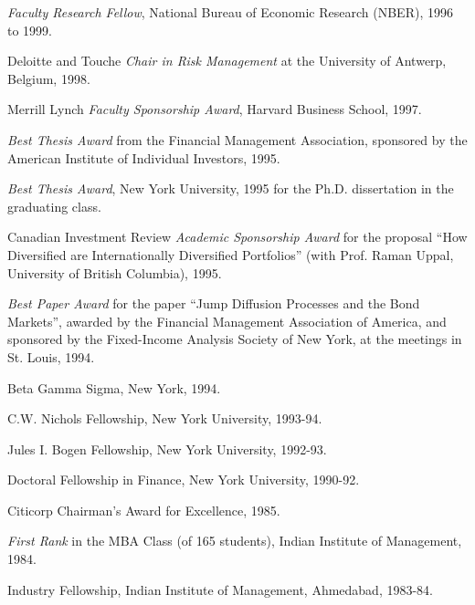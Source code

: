 \documentclass{article}
\begin{document}
\begin{description}
\begin{etaremune}
\item {\it Faculty Research Fellow}, National Bureau of Economic
Research (NBER), 1996 to 1999.

\item Deloitte and Touche {\it Chair in Risk Management} at the
University of Antwerp, Belgium, 1998.

\item Merrill Lynch {\it Faculty Sponsorship Award}, Harvard Business
School, 1997.

\item {\it Best Thesis Award} from the Financial Management Association,
sponsored by the American Institute
of Individual Investors, 1995. 

\item {\it Best Thesis Award}, New York University, 1995 for the Ph.D.
dissertation in the graduating class. 

\item Canadian Investment Review {\it Academic Sponsorship Award} for
the proposal ``How Diversified are Internationally Diversified
Portfolios'' (with Prof. Raman Uppal, University of British Columbia), 1995. 

\item {\it Best Paper Award} for the paper ``Jump Diffusion Processes
and the Bond Markets'', awarded by the Financial Management Association
of America, and sponsored by the Fixed-Income Analysis Society of New
York, at the meetings in St. Louis, 1994. 

\item Beta Gamma Sigma, New York, 1994. 

\item C.W. Nichols Fellowship, New York University, 1993-94. 

\item Jules I. Bogen Fellowship, New York University, 1992-93. 

\item Doctoral Fellowship in Finance, New York University, 1990-92. 

\item Citicorp Chairman's Award for Excellence, 1985. 

\item {\it First Rank} in the MBA Class (of 165 students),
Indian Institute of Management, 1984. 

\item Industry Fellowship, Indian Institute of Management, Ahmedabad, 1983-84. 


\end{etaremune}
\end{description}
\end{document}
